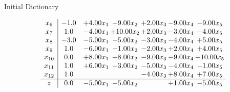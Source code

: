 \documentclass[8pt]{article}
\begin{document}
Initial Dictionary 

\[\begin{array}{c| c c@{\hskip 2pt} c@{\hskip 2pt} c@{\hskip 2pt} c@{\hskip 2pt} c@{\hskip 2pt} }
 x_{6}   &  -1.0 & +  4.00 x_{1} & -9.00 x_{2} & +  2.00 x_{3} & -9.00 x_{4} & -9.00 x_{5}\\
 x_{7}   &  1.0 & -4.00 x_{1} & + 10.00 x_{2} & +  2.00 x_{3} & -3.00 x_{4} & -4.00 x_{5}\\
 x_{8}   &  -3.0 & -5.00 x_{1} & -5.00 x_{2} & -3.00 x_{3} & -4.00 x_{4} & +  5.00 x_{5}\\
 x_{9}   &  1.0 & -6.00 x_{1} & -1.00 x_{2} & -2.00 x_{3} & +  2.00 x_{4} & +  4.00 x_{5}\\
 x_{10}   &  0.0 & +  8.00 x_{1} & +  8.00 x_{2} & -9.00 x_{3} & -9.00 x_{4} & + 10.00 x_{5}\\
 x_{11}   &  1.0 & +  6.00 x_{1} & +  3.00 x_{2} & -5.00 x_{3} & -4.00 x_{4} & -1.00 x_{5}\\
 x_{12}   &  1.0  &    &   & -4.00 x_{3} & +  8.00 x_{4} & +  7.00 x_{5}\\
\hline
z    &  0.0 & -5.00 x_{1} & -5.00 x_{2} &   & +  1.00 x_{4} & -5.00 x_{5}\\
\end{array}\]
\end{document}
